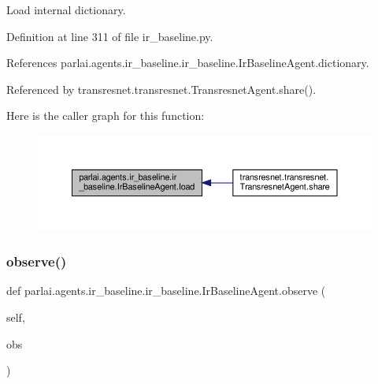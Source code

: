 \begin{DoxyVerb}Load internal dictionary.\end{DoxyVerb}
 

Definition at line 311 of file ir\+\_\+baseline.\+py.



References parlai.\+agents.\+ir\+\_\+baseline.\+ir\+\_\+baseline.\+Ir\+Baseline\+Agent.\+dictionary.



Referenced by transresnet.\+transresnet.\+Transresnet\+Agent.\+share().

Here is the caller graph for this function\+:
\nopagebreak
\begin{figure}[H]
\begin{center}
\leavevmode
\includegraphics[width=350pt]{classparlai_1_1agents_1_1ir__baseline_1_1ir__baseline_1_1IrBaselineAgent_a3701001e1de9bcc2d110a318799101c1_icgraph}
\end{center}
\end{figure}
\mbox{\label{classparlai_1_1agents_1_1ir__baseline_1_1ir__baseline_1_1IrBaselineAgent_ad5edc81f811cfdd89c8518619f5ae15a}} 
\subsubsection{\texorpdfstring{observe()}{observe()}}
{\footnotesize\ttfamily def parlai.\+agents.\+ir\+\_\+baseline.\+ir\+\_\+baseline.\+Ir\+Baseline\+Agent.\+observe (\begin{DoxyParamCaption}\item[{}]{self,  }\item[{}]{obs }\end{DoxyParamCaption})}

